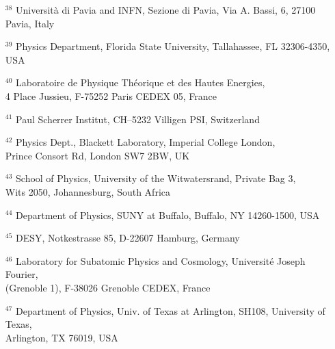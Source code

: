 \begin{itemize}
\item[$^{38}$] 
  Universit\`a di Pavia and INFN, Sezione di Pavia, Via A. Bassi, 6, 27100 Pavia, Italy

\item[$^{39}$] 
  Physics Department, Florida State University, Tallahassee, FL 32306-4350, USA

\item[$^{40}$] 
  Laboratoire de Physique Th\'eorique et des Hautes Energies, \\
  4 Place Jussieu, F-75252 Paris CEDEX 05, France

\item[$^{41}$] 
  Paul Scherrer Institut, CH--5232 Villigen PSI, Switzerland

\item[$^{42}$] 
  Physics Dept., Blackett Laboratory, Imperial College London, \\
  Prince Consort Rd, London SW7 2BW, UK

\item[$^{43}$] 
  School of Physics, University of the Witwatersrand, Private Bag 3, \\
  Wits 2050, Johannesburg, South Africa

\item[$^{44}$] 
  Department of Physics, SUNY at Buffalo, Buffalo, NY 14260-1500, USA

\item[$^{45}$] 
  DESY, Notkestrasse 85, D-22607 Hamburg, Germany

\item[$^{46}$] 
  Laboratory for Subatomic Physics and Cosmology, Universit\'e Joseph
  Fourier, \\ 
  (Grenoble 1),  F-38026 Grenoble CEDEX, France

\item[$^{47}$] 
   Department of Physics, Univ. of Texas at Arlington, 
   SH108, University of Texas,\\
    Arlington, TX 76019, USA 

\end{itemize}

